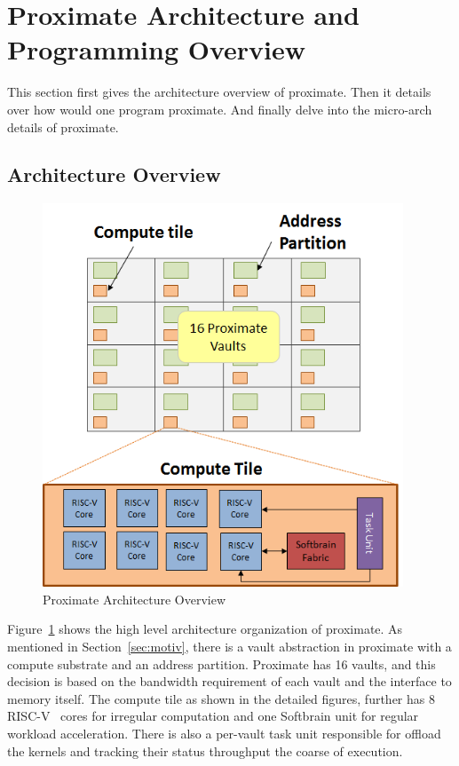 \section{Proximate Architecture and Programming Overview} \label{sec:arch}

This section first gives the architecture overview of proximate. Then
it details over how would one program proximate. And finally delve into the micro-arch details of
proximate.

\subsection{Architecture Overview}

\begin{figure}
  \begin{center}
    \includegraphics[width=0.65\linewidth, height=4.5in]{cs758-figs/arch-overview.png}
  \end{center}
\vspace{-0.2in}
  \caption{Proximate Architecture Overview}
  \label{fig:arch-overview}
\vspace{-0.05in}
\end{figure}

Figure~\ref{fig:arch-overview} shows the high level architecture organization of
proximate. As mentioned in Section~\ref{sec:motiv}, there is a vault abstraction 
in proximate with a compute substrate and an address partition. Proximate has 16 vaults, and this
decision is based on the bandwidth requirement of each vault and the interface to memory itself. 
The compute tile as shown in the detailed figures, further has 8 RISC-V~\cite{waterman2015risc}
cores for irregular computation and one Softbrain unit for regular workload acceleration. 
There is also a per-vault task unit responsible for offload the kernels and tracking their status
throughput the coarse of execution.

